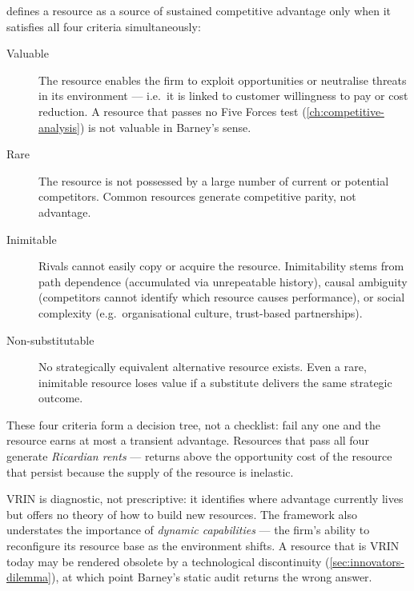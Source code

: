 \textcite{barney1991resource} defines a resource as a source of sustained competitive
advantage only when it satisfies all four criteria simultaneously:
\begin{description}
  \item[Valuable] The resource enables the firm to exploit opportunities or neutralise threats
        in its environment --- i.e.\ it is linked to customer willingness to pay or cost
        reduction. A resource that passes no Five Forces test (\cref{ch:competitive-analysis})
        is not valuable in Barney's sense.
  \item[Rare] The resource is not possessed by a large number of current or potential
        competitors. Common resources generate competitive parity, not advantage.
  \item[Inimitable] Rivals cannot easily copy or acquire the resource. Inimitability stems
        from path dependence (accumulated via unrepeatable history), causal ambiguity
        (competitors cannot identify which resource causes performance), or social complexity
        (e.g.\ organisational culture, trust-based partnerships).
  \item[Non-substitutable] No strategically equivalent alternative resource exists. Even a
        rare, inimitable resource loses value if a substitute delivers the same strategic
        outcome.
\end{description}
These four criteria form a decision tree, not a checklist: fail any one and the resource
earns at most a transient advantage. Resources that pass all four generate
\emph{Ricardian rents} --- returns above the opportunity cost of the resource that persist
because the supply of the resource is inelastic.

VRIN is diagnostic, not prescriptive: it identifies where advantage currently lives but
offers no theory of how to build new resources. The framework also understates the
importance of \emph{dynamic capabilities} --- the firm's ability to reconfigure its resource
base as the environment shifts. A resource that is VRIN today may be rendered obsolete by
a technological discontinuity (\cref{sec:innovators-dilemma}), at which point Barney's
static audit returns the wrong answer.

